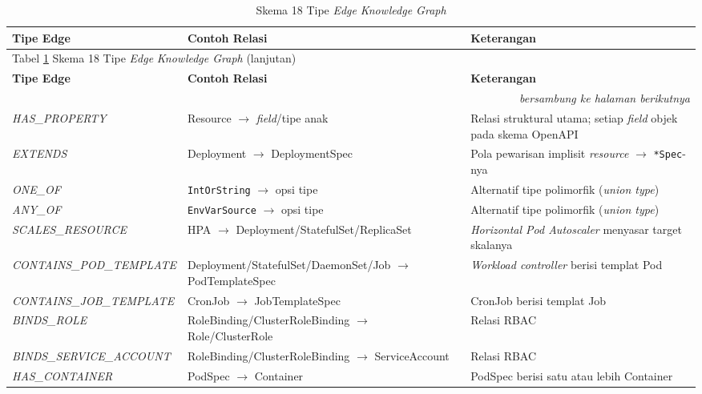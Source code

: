 \begin{footnotesize}
\begin{longtable}{|p{3.4cm}|p{4.4cm}|p{4.5cm}|}
\caption{Skema 18 Tipe \textit{Edge} \textit{Knowledge Graph}}
\label{tbl:edge-schema} \\
\hline
\textbf{Tipe Edge} & \textbf{Contoh Relasi} & \textbf{Keterangan} \\
\hline
\endfirsthead
\hline
\multicolumn{3}{l}{Tabel \ref{tbl:edge-schema} Skema 18 Tipe \textit{Edge} \textit{Knowledge Graph} (lanjutan)} \\
\hline
\textbf{Tipe Edge} & \textbf{Contoh Relasi} & \textbf{Keterangan} \\
\hline
\endhead
\hline
\multicolumn{3}{r}{\textit{bersambung ke halaman berikutnya}} \\
\endfoot
\hline
\endlastfoot
\textit{HAS\_PROPERTY} & Resource $\rightarrow$ \textit{field}/tipe anak & Relasi struktural utama; setiap \textit{field} objek pada skema OpenAPI \\
\hline
\textit{EXTENDS} & Deployment $\rightarrow$ DeploymentSpec & Pola pewarisan implisit \textit{resource} $\rightarrow$ \texttt{*Spec}-nya \\
\hline
\textit{ONE\_OF} & \texttt{IntOrString} $\rightarrow$ opsi tipe & Alternatif tipe polimorfik (\textit{union type}) \\
\hline
\textit{ANY\_OF} & \texttt{EnvVarSource} $\rightarrow$ opsi tipe & Alternatif tipe polimorfik (\textit{union type}) \\
\hline
\textit{SCALES\_RESOURCE} & HPA $\rightarrow$ Deployment\slash StatefulSet\slash ReplicaSet & \textit{Horizontal Pod Autoscaler} menyasar target skalanya \\
\hline
\textit{CONTAINS\_\allowbreak POD\_TEMPLATE} & Deployment\slash StatefulSet\slash DaemonSet\slash Job $\rightarrow$ PodTemplateSpec & \textit{Workload controller} berisi templat Pod \\
\hline
\textit{CONTAINS\_\allowbreak JOB\_TEMPLATE} & CronJob $\rightarrow$ JobTemplateSpec & CronJob berisi templat Job \\
\hline
\textit{BINDS\_ROLE} & RoleBinding\slash ClusterRoleBinding $\rightarrow$ Role\slash ClusterRole & Relasi RBAC \\
\hline
\textit{BINDS\_\allowbreak SERVICE\_ACCOUNT} & RoleBinding\slash ClusterRoleBinding $\rightarrow$ ServiceAccount & Relasi RBAC \\
\hline
\textit{HAS\_CONTAINER} & PodSpec $\rightarrow$ Container & PodSpec berisi satu atau lebih Container \\

\end{longtable}
\end{footnotesize}
